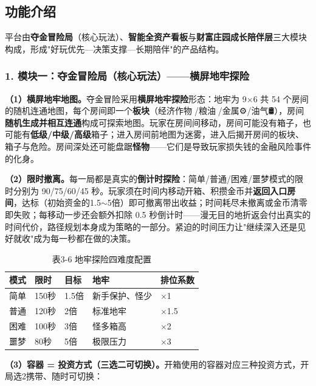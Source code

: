 \documentclass[12pt,a4paper]{ctexart}
\begin{document}
\subsection{功能介绍}
平台由\textbf{夺金冒险局}（核心玩法）、\textbf{智能全资产看板}与\textbf{财富庄园成长陪伴层}三大模块构成，形成"好玩优先—决策支撑—长期陪伴"的产品结构。

\subsubsection{1. 模块一：夺金冒险局（核心玩法）——横屏地牢探险}

\textbf{（1）横屏地牢地图。}夺金冒险采用\textbf{横屏地牢探险}形态：地牢为 9$\times$6 共 54 个房间的随机连通地图，每个房间即一个\textbf{板块}（经济作物🌾/粮油🥜/金属⚙️/油气🛢️），房间\textbf{随机生成并相互连通}构成可探索地图。玩家在房间间移动，房间可能没有箱子，也可能有\textbf{低级/中级/高级}箱子；进入房间前地图为迷雾，进入后揭开房间的板块、箱子与危险。房间深处还可能盘踞\textbf{怪物}——它们是导致玩家损失钱的金融风险事件的化身。

\textbf{（2）限时撤离。}每一局都是真实的\textbf{倒计时探险}：简单/普通/困难/噩梦模式的限时分别为 90/75/60/45 秒。玩家须在时间内移动开箱、积攒金币并\textbf{返回入口房间}，达标（初始资金的1.5$\sim$5倍）即可撤离带出收益；时间耗尽未撤离或金币清零即失败；每移动一步还会额外扣除 0.5 秒倒计时——漫无目的地折返会付出真实的时间代价，路径规划本身成为策略的一部分。紧迫的时间压力让"继续深入还是见好就收"成为每一秒都在做的决策。

\begin{table}[htbp]
\centering
\begin{tabular}{p{2cm}p{2cm}p{2.4cm}p{3.4cm}p{2cm}}
\toprule
\textbf{模式} & \textbf{限时} & \textbf{目标} & \textbf{地牢} & \textbf{排位系数} \\
\midrule
简单 & 150秒 & 1.5倍 & 新手保护、怪少 & $\times$1 \\
普通 & 120秒 & 2倍 & 标准地牢 & $\times$1.5 \\
困难 & 100秒 & 3倍 & 怪多箱高 & $\times$2 \\
噩梦 & 80秒 & 5倍 & 极限压力 & $\times$3 \\
\bottomrule
\end{tabular}
\caption*{表3-6 \quad 地牢探险四难度配置}
\end{table}

\textbf{（3）容器 = 投资方式（三选二可切换）。}开箱使用的容器对应三种投资方式，开局选2携带、随时可切换：
\end{document}
